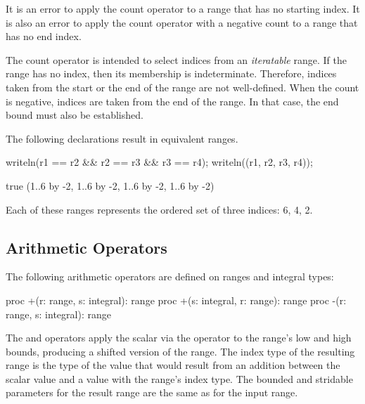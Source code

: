 It is an error to apply the count operator to a range that
has no starting index.  It is also an error to apply the count operator
with a negative count to a range that has no end index.

\begin{rationale}
The count operator is intended to select indices from an \emph{iteratable}
range.  If the range has no  index, then its membership is
indeterminate.  Therefore, indices taken from the start or the end of the range
are not well-defined.  When the count is negative, indices are taken from the
end of the range.  In that case, the end bound must also be established.
\end{rationale}

\begin{example}
The following declarations result in equivalent ranges.
\begin{chapelpre}
\end{chapelpre}
\begin{chapelpost}
writeln(r1 == r2 \&\& r2 == r3 \&\& r3 == r4);
writeln((r1, r2, r3, r4));
\end{chapelpost}
\begin{chapeloutput}
true
(1..6 by -2, 1..6 by -2, 1..6 by -2, 1..6 by -2)
\end{chapeloutput}
Each of these ranges represents the ordered set of three indices: 6, 4, 2.
\end{example}

\subsection{Arithmetic Operators}
\label{Range_Arithmetic}

The following arithmetic operators are defined on ranges and integral
types:

\begin{chapel}
proc +(r: range, s: integral): range
proc +(s: integral, r: range): range
proc -(r: range, s: integral): range
\end{chapel}

The \chpl{+} and \chpl{-} operators apply the scalar via the operator
to the range's low and high bounds, producing a shifted version of the
range.  The index type of the resulting range is the type of the value
that would result from an addition between the scalar value and a value
with the range's index type.  The bounded and stridable parameters for
the result range are the same as for the input range.

